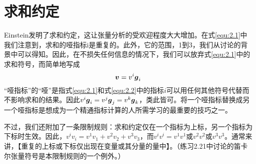 \section{求和约定}
Einstein发明了求和约定，这让张量分析的受欢迎程度大大增加。在式\eqref{equ:2.1}中我们注意到，求和的哑指标i是重复的。此外，它的范围，1到3，我们从讨论的背景中可以得知。因此，在不损失任何信息的情况下，我们可以放弃式\eqref{equ:2.1}中的求和符号，而简单地写成
\begin{equation}\label{equ:2.2}
    \boldsymbol{v}=v^i\boldsymbol{g}_i
\end{equation}
“哑指标”的“哑”是指式\eqref{equ:2.1}和式\eqref{equ:2.2}中的指标$i$可以用任何其他符号代替而不影响求和的结果。因此$v^i\boldsymbol{g}_i=v^j\boldsymbol{g}_j=v^k\boldsymbol{g}_k$，类此皆可。将一个哑指标替换成另一个哑指标是想成为一个精通指标计算的人所需学习的最重要的技巧之一。

不过，我们还附加了一条限制规则：求和约定仅在一个指标为上标，另一个指标为下标时生效。因此，$v^iv_i=v^1v_1+v^2v_2+v^3v_3$，而$v^iv^i=v^1v^1$或$v^2v^2$或$v^3v^3$。通常来讲，【重复的上标或下标仅出现在变量或其分量的量中】。（练习2.21中讨论的笛卡尔张量符号是本限制规则的一个例外。）